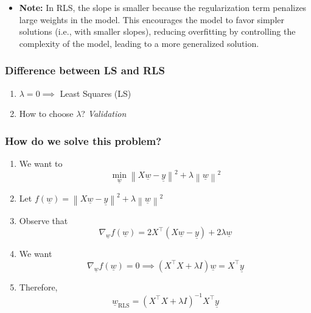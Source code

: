 \begin{example}
    \begin{itemize}
        \item \textbf{Note:} 
        In RLS, the slope is smaller because the regularization term penalizes large weights in the model. This encourages the model to favor simpler solutions (i.e., with smaller slopes), reducing overfitting by controlling the complexity of the model, leading to a more generalized solution.
    \end{itemize}
\end{example}

    \subsubsection{Difference between LS and RLS}
    \begin{intuition}
        \begin{enumerate}
            \item \( \lambda = 0 \implies \) Least Squares (LS)
            \item How to choose \( \lambda \)? \quad \textit{Validation}
        \end{enumerate}        
    \end{intuition}

    \subsubsection{How do we solve this problem?}
    \begin{definition}
        \begin{enumerate}

            \item We want to
            \[
            \min_{\underline{w}} \left\| X\underline{w} - \underline{y} \right\|^2 + \lambda \left\| \underline{w} \right\|^2
            \]
        
            \item Let \( f(\underline{w}) = \left\| X\underline{w} - \underline{y} \right\|^2 + \lambda \left\| \underline{w} \right\|^2 \)
        
            \item Observe that
            \[
            \nabla_{\underline{w}} f(\underline{w}) = 2X^{\top} (X\underline{w} - \underline{y}) + 2\lambda \underline{w}
            \]
        
            \item We want
            \[
            \nabla_{\underline{w}} f(\underline{w}) = 0 \implies (X^{\top} X + \lambda I) \underline{w} = X^{\top} \underline{y}
            \]
        
            \item Therefore,
            \[
            \underline{w}_{\text{RLS}} = (X^{\top} X + \lambda I)^{-1} X^{\top} \underline{y}
            \]
        
        \end{enumerate}
    \end{definition}


